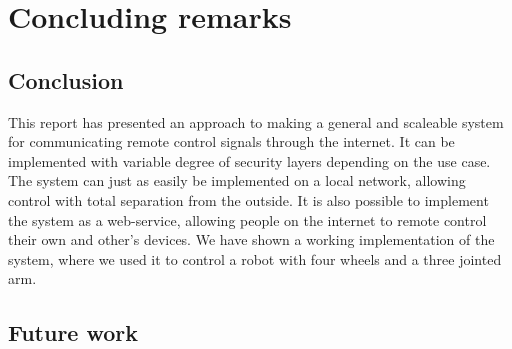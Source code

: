 \chapter{Concluding remarks}
\section{Conclusion}
This report has presented an approach to making a general and scaleable system for communicating remote control signals through the internet.
It can be implemented with variable degree of security layers depending on the use case.
The system can just as easily be implemented on a local network, allowing control with total separation from the outside. 
It is also possible to implement the system as a web-service, allowing people on the internet to remote control their own and other's devices.
We have shown a working implementation of the system, where we used it to control a robot with four wheels and a three jointed arm.

\section{Future work}


